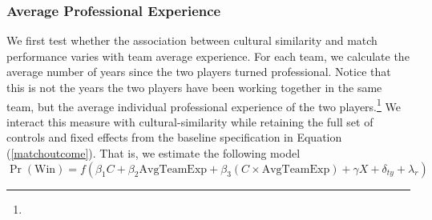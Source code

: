\documentclass[10pt]{article}
\begin{document}
\subsubsection{Average Professional Experience} 










We first test whether the association between cultural similarity and match performance varies with team average experience. For each team, we calculate the average number of years since the two players turned professional. Notice that this is not the years the two players have been working together in the same team, but the average individual professional experience of the two players.\footnote{} We interact this measure with cultural-similarity while retaining the full set of controls and fixed effects from the baseline specification in Equation (\ref{matchoutcome}). That is, we estimate the following model
\begin{equation}
\operatorname{Pr}(\text{Win}) = f(\beta_1 C + \beta_2 \text{AvgTeamExp} + \beta_3 (C \times \text{AvgTeamExp}) + \gamma X + \delta_{ty} + \lambda_r)
\end{equation}
\end{document}
